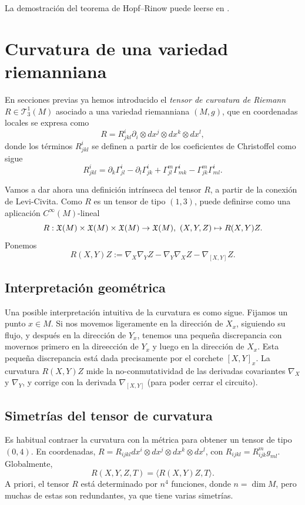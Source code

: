 \documentclass[11pt,a4paper]{amsbook}
\theoremstyle{remark} \newtheorem{rmk}[subsection]{Observación}
\theoremstyle{definition} \newtheorem{defn}[subsection]{Definición}
\theoremstyle{definition} \newtheorem{ex}[subsection]{Ejemplo}
\theoremstyle{definition} \newtheorem{ej}[subsection]{Ejercicio}
\begin{document}
La demostración del teorema de Hopf--Rinow puede leerse en .

\section{Curvatura de una variedad riemanniana}
En secciones previas ya hemos introducido el \emph{tensor de curvatura de Riemann} $R\in \mathcal{T}^1_3(M)$ asociado a una variedad riemanniana $(M,g)$, que en coordenadas locales se expresa como
\begin{equation*}
R=R^i_{jkl} \partial_i \otimes dx^j \otimes dx^k \otimes dx^l,
\end{equation*}
donde los términos $R^i_{jkl}$ se definen a partir de los coeficientes de Christoffel como sigue
\begin{equation*}
R^i_{jkl} = \partial_{k}\Gamma^i_{jl} - \partial_l \Gamma^i_{jk} + \Gamma^m_{jl} \Gamma^i_{mk} - \Gamma^m_{jk} \Gamma^i_{ml}.
\end{equation*}

Vamos a dar ahora una definición intrínseca del tensor $R$, a partir de la conexión de Levi-Civita. Como $R$ es un tensor de tipo $(1,3)$, puede definirse como una aplicación $C^\infty(M)$-lineal
\begin{equation*}
R: \mathfrak X(M)\times \mathfrak X(M) \times \mathfrak X(M) \rightarrow \mathfrak X(M),\ (X,Y,Z) \mapsto R(X,Y) Z.
\end{equation*}
Ponemos
\begin{equation*}
R(X,Y)Z:= \nabla_X \nabla_Y Z - \nabla_Y \nabla_X Z - \nabla_{[X,Y]}Z.
\end{equation*}

\subsection{Interpretación geométrica} Una posible interpretación intuitiva de la curvatura es como sigue. Fijamos un punto $x\in M$. Si nos movemos ligeramente en la dirección de $X_x$, siguiendo su flujo, y después en la dirección de $Y_x$, tenemos una pequeña discrepancia con movernos primero en la direección de $Y_x$ y luego en la dirección de $X_x$. Esta pequeña discrepancia está dada precisamente por el corchete $[X,Y]_x$. La curvatura $R(X,Y)Z$ mide la no-conmutatividad de las derivadas covariantes $\nabla_X$ y $\nabla_Y$, y corrige con la derivada $\nabla_{[X,Y]}$ (para poder cerrar el circuito).

\subsection{Simetrías del tensor de curvatura} Es habitual contraer la curvatura con la métrica para obtener un tensor de tipo $(0,4)$. En coordenadas,
$R = R_{ijkl} dx^i \otimes dx^j \otimes dx^k \otimes dx^l$,
con $R_{ijkl}=R^m_{ijk}g_{ml}$. Globalmente,
\begin{equation*}
R(X,Y,Z,T) = \langle R(X,Y)Z,T \rangle.
\end{equation*}
A priori, el tensor $R$ está determinado por $n^4$ funciones, donde $n=\dim M$, pero muchas de estas son redundantes, ya que tiene varias simetrías.
\end{document}
